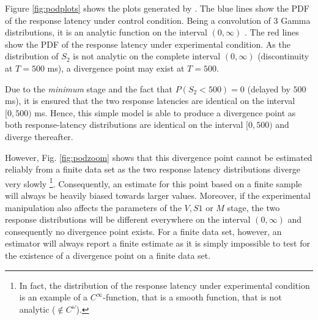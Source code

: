 Figure \ref{fig:podplots} shows the plots generated by . The blue lines show the PDF
of the response latency under control condition. Being a convolution of 3 Gamma distributions, it 
is an analytic function on the interval $(0,\infty)$ \citep{Mathai1982}. The red lines show the 
PDF of the response latency under experimental condition. As the distribution of $S_2$ is not analytic on 
the complete interval $(0,\infty)$ (discontinuity at $T=500$ ms), a divergence point may exist at 
$T=500$. 

Due to the \emph{minimum} stage and the fact that $P(S_2<500)=0$ (delayed by 
$500$ ms), it is ensured that the two response latencies are identical on the interval $[0,500)$ ms.
Hence, this simple model is able to produce a divergence point as both response-latency distributions are identical
on the interval $[0,500)$ and diverge thereafter.

However, Fig. \ref{fig:podzoom} shows that this divergence point cannot be estimated reliably from
a finite data set as the two response latency distributions diverge very slowly%
\footnote{In fact, the distribution of the response latency under experimental condition is an
example of a $C^\infty$-function, that is a smooth function, that is not analytic
($\notin C^\omega$).}. Consequently, an estimate for this point \cite[e.g. by means of estimators 
proposed in][]{Reingold2012} based on a finite sample will always be heavily biased towards larger
values. Moreover, if the experimental manipulation also affects the parameters of the $V, S1$ or 
$M$ stage, the two response distributions will be different everywhere on the interval
$(0,\infty)$ and consequently no divergence point exists. For a finite data set, however, an
estimator \cite[like][]{Reingold2012} will always report a finite estimate as it is simply impossible
to test for the existence of a divergence point on a finite data set. 